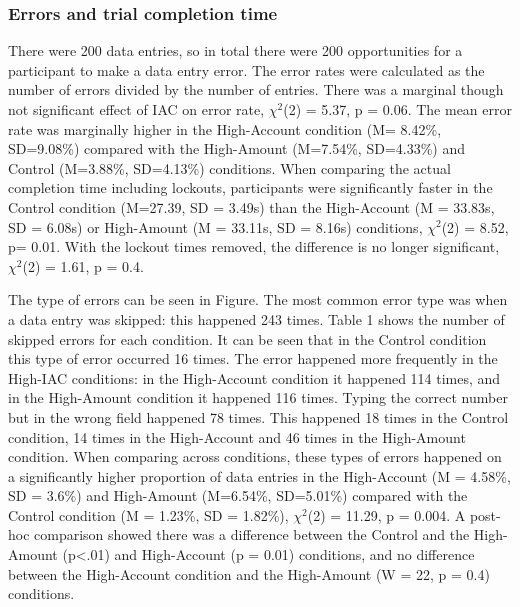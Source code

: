 


\subsubsection{Errors and trial completion time}
There were 200 data entries, so in total there were 200 opportunities for a participant to make a data entry error. The error rates were calculated as the number of errors divided by the number of entries. 
There was a marginal though not significant effect of IAC on error rate, $\chi^2$(2) = 5.37, p = 0.06. The mean error rate was marginally higher in the High-Account condition (M= 8.42\%, SD=9.08\%) compared with the High-Amount (M=7.54\%, SD=4.33\%) and Control (M=3.88\%, SD=4.13\%) conditions. When comparing the actual completion time including lockouts, participants were significantly faster in the Control condition (M=27.39, SD = 3.49s) than the High-Account (M = 33.83s, SD = 6.08s) or High-Amount (M = 33.11s, SD = 8.16s) conditions,  $\chi^2$(2) = 8.52, p= 0.01. With the lockout times removed, the difference is no longer significant, $\chi^2$(2) = 1.61, p = 0.4.

The type of errors can be seen in Figure. The most common error type was when a data entry was skipped: this happened 243 times. Table 1 shows the number of skipped errors for each condition. It can be seen that in the Control condition this type of error occurred 16 times. The error happened more frequently in the High-IAC conditions: in the High-Account condition it happened 114 times, and in the High-Amount condition it happened 116 times.
Typing the correct number but in the wrong field happened 78 times. This happened 18 times in the Control condition, 14 times in the High-Account and 46 times in the High-Amount condition.
When comparing across conditions, these types of errors happened on a significantly higher proportion of data entries in the High-Account (M = 4.58\%, SD = 3.6\%) and High-Amount (M=6.54\%, SD=5.01\%) compared with the Control condition (M = 1.23\%, SD = 1.82\%),  $\chi^2$(2) = 11.29, p = 0.004.  A post-hoc comparison showed there was a difference between the Control and the High-Amount (p<.01) and High-Account (p = 0.01) conditions, and no difference between the High-Account condition and the High-Amount (W = 22, p = 0.4) conditions.


